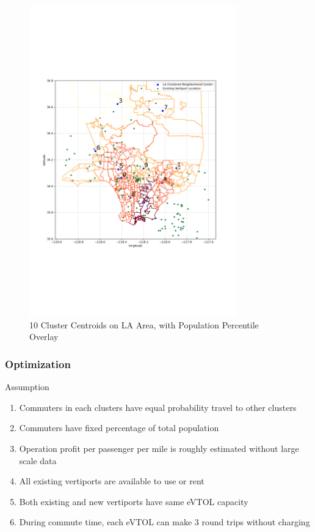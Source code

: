 \documentclass{article}
\begin{document}
\begin{figure}[ht]
\centering
\includegraphics[width=0.8\textwidth]{proj04.png}
\vspace*{-45mm}
\caption{10 Cluster Centroids on LA Area, with Population Percentile Overlay }
\label{fig:proj04}
\end{figure}

\subsubsection{Optimization}

Assumption
\begin{enumerate}
  \item Commuters in each clusters have equal probability travel to other clusters
  \item Commuters have fixed percentage of total population
  \item Operation profit per passenger per mile is roughly estimated without large scale data
  \item All existing vertiports are available to use or rent
  \item Both existing and new vertiports have same eVTOL capacity
  \item During commute time, each eVTOL can make 3 round trips without charging
\end{enumerate}
\end{document}
